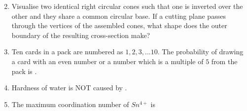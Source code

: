 \documentclass[journal]{IEEEtran}
\numberwithin{equation}{enumi}
\numberwithin{figure}{enumi}
\begin{document}
\begin{enumerate}[start=1, label={Q\arabic*.}]
\begin{enumerate}
\begin{multicols}{2}
\begin{center}
\end{center}
  \end{multicols}
  \end{enumerate}
  \newpage
\item Visualise two identical right circular cones such that one is inverted over the other and they share a common circular base. If a cutting plane passes through the vertices of the assembled cones, what shape does the outer boundary of the resulting cross-section make?
 \begin{enumerate} 
  \end{enumerate}
 \item Ten cards in a pack are numbered as $1,2,3,...10$. The probability of drawing a card with an even number or a number which is a multiple of $5$ from the pack is \underline{\hspace{1.5cm}}.
\begin{enumerate} 
  \end{enumerate}
\item Hardness of water is NOT caused by \underline{\hspace{1.5cm}}.
\begin{enumerate} 
  \end{enumerate}
\item The maximum coordination number of $Sn^{4+}$ is \underline{\hspace{1.5cm}}

\end{enumerate}
\end{document}
